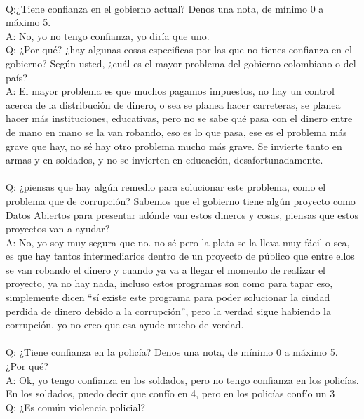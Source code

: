\documentclass{phyasgn}\usepackage{nag}
\begin{document}
\\
Q:¿Tiene confianza en el gobierno actual? Denos una nota, de mínimo 0 a máximo 5. \\
A: No, yo no tengo confianza, yo diría que uno.\\
Q: ¿Por qué? ¿hay algunas cosas especificas por las que no tienes confianza en el gobierno? Según usted, ¿cuál es el mayor problema del gobierno colombiano o del país?\\
A: El mayor problema es que muchos pagamos impuestos, no hay un control acerca de la distribución de dinero, o sea se planea hacer carreteras, se planea hacer más instituciones, educativas, pero no se sabe qué pasa con el dinero entre de mano en mano se la van robando, eso es lo que pasa, ese es el problema más grave que hay, no sé hay otro problema mucho más grave. Se invierte tanto en armas y en soldados, y no se invierten en educación, desafortunadamente. \\
\\
Q: ¿piensas que hay algún remedio para solucionar este problema, como el problema que de corrupción? Sabemos que el gobierno tiene algún proyecto como Datos Abiertos para presentar adónde van estos dineros y cosas, piensas que estos proyectos van a ayudar?\\
A: No, yo soy muy segura que no. no sé pero la plata se la lleva muy fácil o sea, es que hay tantos intermediarios dentro de un proyecto de público que entre ellos se van robando el dinero y cuando ya va a llegar el momento de realizar el proyecto, ya no hay nada, incluso estos programas son como para tapar eso, simplemente dicen “sí existe este programa para poder solucionar la ciudad perdida de dinero debido a la corrupción”, pero la verdad sigue habiendo la corrupción. yo no creo que esa ayude mucho de verdad.\\
\\
Q: ¿Tiene confianza en la policía? Denos una nota, de mínimo 0 a máximo 5. ¿Por qué?\\
A: Ok, yo tengo confianza en los soldados, pero no tengo confianza en los policías. En los soldados, puedo decir que confío en 4, pero en los policías confío un 3\\
Q: ¿Es común violencia policial?\\
\end{document}
